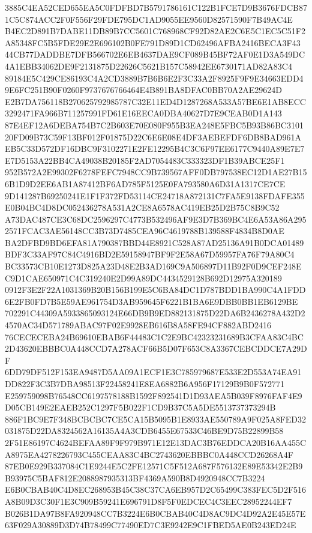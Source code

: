 \documentclass[UTF8,fontset=fandol,zihao=-4,a4paper]{ctexart}
\begin{document}
{{3885C4EA52CED655EA5C0FDFBD7B5791786161C122B1FCE7D9B3676FDCB871C5C874ACC2F0F556F29FDE795DC1AD9055EE9560D82571590F7B49AC4E
B4EC2D891B7DABE11DB89B7CC5601C768968CF92D82AE2C6E5C1EC5C51F2A85348FC5B5FDE29E2E696102B0FE791D89D1CD62496AFBA2416BECA3F43
44CB77DADDBE7DFB566702E6EB4637DAE9CF089B45BF72AF0E1D3A549DC4A1EBB34062DE9F2131875D22626C5621B157C58942EE6730171AD82A83C4
89184E5C429CE86193C4A2CD3889B7B6B6E2F3C33A2F8925F9F9E34663EDD49E6FC251B90F0260F9737676766464E4B891BA8DFAC0BB70A2AE29624D
E2B7DA756118B270625792985787C32E11ED4D1287268A533A57BE6E1AB8ECC3292471FA966B711257991FD61E16EECA0DBA40627D7E9CEAB0D1A143
87E4EF12A6DEBA754B7C2B603E70E080F955B3EA248E5FBC5B93B86BC310120FD09B73C59F13BF012F01875D22C6E6E08E4DF3AEBEFDF6DB8BAD961A
EB5C33D572DF16DBC9F3102271E2FE12295B4C3C6F97EE6177C9440A89E7E7E7D5153A22BB4CA49038B20185F2AD7054483C333323DF1B39ABCE25F1
952B572A2E99302F6278FEFC7948CC9B739567AFF0DB797538EC12D1AE27B156B1D9D2EE6AB1A87412BF6AD785F5125E0FA793580A6D31A1317CE7CE
9D141287B69250241E1F1F372FD53114CE24718A872131C7FA5E9138FDAFE355E0B04BC4D8DC052436278A531A2CE8A6578AC419EB25D2B75C8B9C52
A73DAC487CE3C68DC2596297C4773B532496AF9E3D7B369BC4E6A53A86A2952571FCAC3AE56148CC3B73D7485CEA96C4619788B139588F4834B8D0AE
BA2DFBD9BD6EFA81A790387BBD44E8921C528A87AD25136A91B0DCA01489BDF3C33AF97C84C4916BD2E59158947BF9F2E58A67D59957FA76F79A80C4
BC33573CB10E1273D825A23D48E2B3AD169C9A506897D11B92F0D9CEF248EC9D1CAE650971C4C319240E2D99A89DC4434529128B692D12975A320189
0912F3E2F22A1031369B20B156B199E5C6BA84DC1D787BDD1BA990C4A1FDD6E2FB0FD7B5E59AE961754D3AB959645F6221B1BA6E9DBB0BB1EB6129BE
702291C44309A5933865093124E66DB9B9ED882131875D22DA6B2436278A432D24570AC34D571789ABAC97F02E9928EB616B8A58FE94CF882ABD2416
76CECECEBA24B69610EBAB6F44483C1C2E9BC42323231689B3CFAA83C4BC2D43620EBBBC0A448CCD7A278ACF66B5D07F653C8A3367CEBCDDCE7A29DF
6DD79DF512F153EA9487D5AA09A1ECF1E3C785979687E533E2D553A74EA91DD822F3C3B7DBA98513F22458241E8EA6882B6A956F17129B9B0F572771
E259759098B76548CC6197578188B1592F892541D1D93AEA5B039F8976FAF4E9D05CB149E2EAEB252C1297F5B022F1CD9B37C5A5DE5513737373294B
886F1BC9E7F348BCBCBC7CE5CA15B5095B1E8933AE550789A9F025A8FED32031875D22DA8324562A16135A4A3CDB6455E67533C46BE9D75B22899B58
2F51E86197C4624BEFAA89F9F979B971E12E13DAC3B76EDDCA20B16AA455CA8975EA4278226793C455CEAA83C4BC2743620EBBBC0A448CCD26268A4F
87EB0E929B337084C1E9244E5C2FE12571C5F512A687F576132E89E53342E2B9B93975C5BAF812E2088987935313BF4369A590B8D4920948CC7B3224
E6B0CBAB40C4D8EC268953B45C38C37CA6EB957D2C65499C383FEC5D2F516A8B09D3C30F1E3C909B59241E696791D8F5F0EDCEC4C3EEC28952244EF7
B026B1DA97B8FA920948CC7B3224E6B0CBAB40C4D8AC9DC4D92A2E45E57E63F029A30889D3D74B78499C77490ED7C3E9242E9C1FBED5AE0B243ED24E
}}
\end{document}
